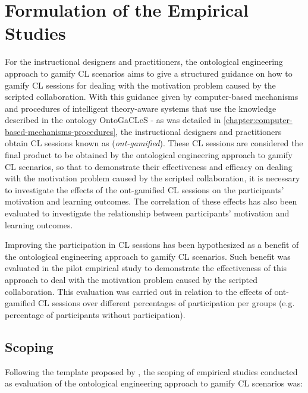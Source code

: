 \section{Formulation of the Empirical Studies}
\label{sec:formulation-empirical-studies}

For the instructional designers and practitioners, the ontological engineering approach to gamify CL scenarios aims to give a structured guidance on how to gamify CL sessions for dealing with the motivation problem caused by the scripted collaboration. With this guidance given by computer-based mechanisms and procedures of intelligent theory-aware systems that use the knowledge described in the ontology OntoGaCLeS - as was detailed in \autoref{chapter:computer-based-mechanisms-procedures}, the instructional designers and practitioners obtain CL sessions known as  (\emph{ont-gamified}). These CL sessions are considered the final product to be obtained by the ontological engineering approach to gamify CL scenarios, so that to demonstrate their effectiveness and efficacy on dealing with the motivation problem caused by the scripted collaboration, it is necessary to investigate the effects of the ont-gamified CL sessions on the participants' motivation and learning outcomes. The correlation of these effects has also been evaluated to investigate the relationship between participants' motivation and learning outcomes.

Improving the participation in CL sessions has been hypothesized as a benefit of the ontological engineering approach to gamify CL scenarios. Such benefit was evaluated in the pilot empirical study to demonstrate the effectiveness of this approach to deal with the motivation problem caused by the scripted collaboration. This evaluation was carried out in relation to the effects of ont-gamified CL sessions over different percentages of participation per groups (e.g. percentage of participants without participation).

\subsection{Scoping}
\label{subsec:scoping}

Following the template proposed by , the scoping of empirical studies conducted as evaluation of the ontological engineering approach to gamify CL scenarios was:

